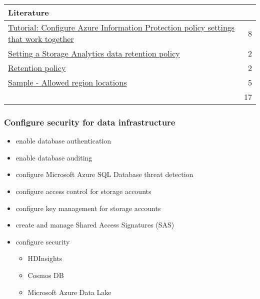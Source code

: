 \begin{tabular}{p{14cm} | r}
\textbf{Literature} & \\
\hline
\href{https://docs.microsoft.com/en-us/azure/information-protection/infoprotect-settings-tutorial}{Tutorial: Configure Azure Information Protection policy settings that work together} & 8 \\
\href{https://docs.microsoft.com/en-us/rest/api/storageservices/setting-a-storage-analytics-data-retention-policy}{Setting a Storage Analytics data retention policy} & 2 \\
\href{https://docs.microsoft.com/en-us/azure/kusto/management/retention-policy}{Retention policy} & 2 \\
\href{https://docs.microsoft.com/en-us/azure/governance/policy/samples/allowed-locations}{Sample - Allowed region locations} & 5 \\
\cline{2-2} 
 & 17 \\
\end{tabular}

\subsubsection{Configure security for data infrastructure}
\begin{itemize}
\item enable database authentication 
\item enable database auditing 
\item configure Microsoft Azure SQL Database threat detection 
\item configure access control for storage accounts 
\item configure key management for storage accounts 
\item create and manage Shared Access Signatures (SAS) 
\item configure security 
	\begin{itemize}
		\item HDInsights
		\item Cosmos DB
		\item Microsoft Azure Data Lake
	\end{itemize} 
\end{itemize}

